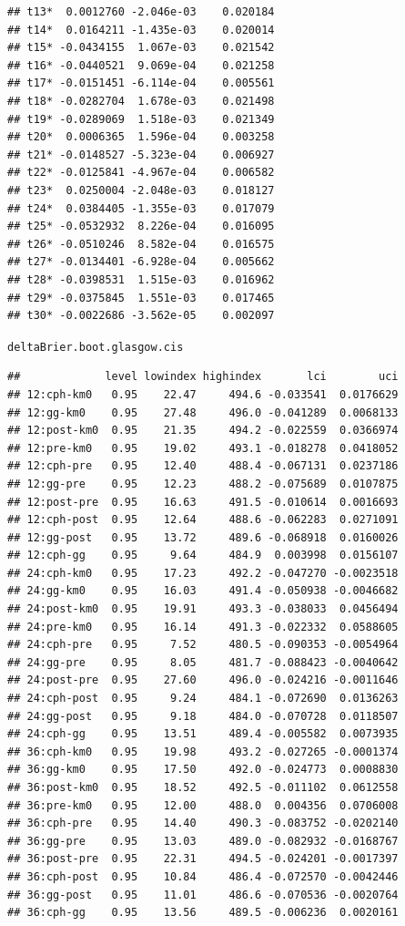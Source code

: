 \documentclass{article}\usepackage[]{graphicx}\usepackage[]{color}
\makeatletter
\newcommand{\hlstd}[1]{\textcolor[rgb]{0.345,0.345,0.345}{#1}}%
\newenvironment{kframe}{%
 \def\at@end@of@kframe{}%
 \ifinner\ifhmode%
  \def\at@end@of@kframe{\end{minipage}}%
  \begin{minipage}{\columnwidth}%
 \fi\fi%
 \def\FrameCommand##1{\hskip\@totalleftmargin \hskip-\fboxsep
 \colorbox{shadecolor}{##1}\hskip-\fboxsep
     \hskip-\linewidth \hskip-\@totalleftmargin \hskip\columnwidth}%
 \MakeFramed {\advance\hsize-\width
   \@totalleftmargin\z@ \linewidth\hsize
   \@setminipage}}%
 {\par\unskip\endMakeFramed%
 \at@end@of@kframe}
\newenvironment{knitrout}{}{} %
\makeatother
\begin{document}
\begin{knitrout}
\begin{kframe}
\begin{verbatim}
## t13*  0.0012760 -2.046e-03    0.020184
## t14*  0.0164211 -1.435e-03    0.020014
## t15* -0.0434155  1.067e-03    0.021542
## t16* -0.0440521  9.069e-04    0.021258
## t17* -0.0151451 -6.114e-04    0.005561
## t18* -0.0282704  1.678e-03    0.021498
## t19* -0.0289069  1.518e-03    0.021349
## t20*  0.0006365  1.596e-04    0.003258
## t21* -0.0148527 -5.323e-04    0.006927
## t22* -0.0125841 -4.967e-04    0.006582
## t23*  0.0250004 -2.048e-03    0.018127
## t24*  0.0384405 -1.355e-03    0.017079
## t25* -0.0532932  8.226e-04    0.016095
## t26* -0.0510246  8.582e-04    0.016575
## t27* -0.0134401 -6.928e-04    0.005662
## t28* -0.0398531  1.515e-03    0.016962
## t29* -0.0375845  1.551e-03    0.017465
## t30* -0.0022686 -3.562e-05    0.002097
\end{verbatim}
\begin{alltt}
\hlstd{deltaBrier.boot.glasgow.cis}
\end{alltt}
\begin{verbatim}
##             level lowindex highindex       lci        uci
## 12:cph-km0   0.95    22.47     494.6 -0.033541  0.0176629
## 12:gg-km0    0.95    27.48     496.0 -0.041289  0.0068133
## 12:post-km0  0.95    21.35     494.2 -0.022559  0.0366974
## 12:pre-km0   0.95    19.02     493.1 -0.018278  0.0418052
## 12:cph-pre   0.95    12.40     488.4 -0.067131  0.0237186
## 12:gg-pre    0.95    12.23     488.2 -0.075689  0.0107875
## 12:post-pre  0.95    16.63     491.5 -0.010614  0.0016693
## 12:cph-post  0.95    12.64     488.6 -0.062283  0.0271091
## 12:gg-post   0.95    13.72     489.6 -0.068918  0.0160026
## 12:cph-gg    0.95     9.64     484.9  0.003998  0.0156107
## 24:cph-km0   0.95    17.23     492.2 -0.047270 -0.0023518
## 24:gg-km0    0.95    16.03     491.4 -0.050938 -0.0046682
## 24:post-km0  0.95    19.91     493.3 -0.038033  0.0456494
## 24:pre-km0   0.95    16.14     491.3 -0.022332  0.0588605
## 24:cph-pre   0.95     7.52     480.5 -0.090353 -0.0054964
## 24:gg-pre    0.95     8.05     481.7 -0.088423 -0.0040642
## 24:post-pre  0.95    27.60     496.0 -0.024216 -0.0011646
## 24:cph-post  0.95     9.24     484.1 -0.072690  0.0136263
## 24:gg-post   0.95     9.18     484.0 -0.070728  0.0118507
## 24:cph-gg    0.95    13.51     489.4 -0.005582  0.0073935
## 36:cph-km0   0.95    19.98     493.2 -0.027265 -0.0001374
## 36:gg-km0    0.95    17.50     492.0 -0.024773  0.0008830
## 36:post-km0  0.95    18.52     492.5 -0.011102  0.0612558
## 36:pre-km0   0.95    12.00     488.0  0.004356  0.0706008
## 36:cph-pre   0.95    14.40     490.3 -0.083752 -0.0202140
## 36:gg-pre    0.95    13.03     489.0 -0.082932 -0.0168767
## 36:post-pre  0.95    22.31     494.5 -0.024201 -0.0017397
## 36:cph-post  0.95    10.84     486.4 -0.072570 -0.0042446
## 36:gg-post   0.95    11.01     486.6 -0.070536 -0.0020764
## 36:cph-gg    0.95    13.56     489.5 -0.006236  0.0020161
\end{verbatim}
\end{kframe}
\end{knitrout}
\end{document}
